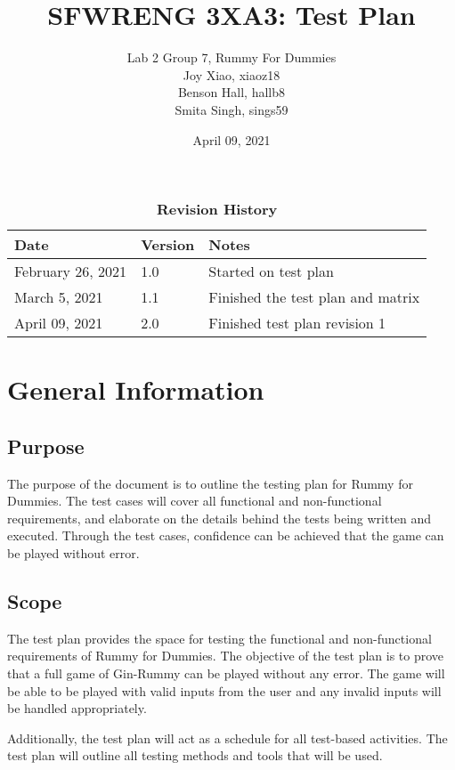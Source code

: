 \documentclass[12pt, titlepage]{article}
\title{SFWRENG 3XA3: Test Plan}
\author{Lab 2 Group 7, Rummy For Dummies
		\\ Joy Xiao, xiaoz18
		\\ Benson Hall, hallb8
		\\ Smita Singh, sings59
}
\date{April 09, 2021}
\begin{document}
\maketitle

\tableofcontents
\listoftables
\listoffigures

\begin{table}[bp]
\caption{\bf Revision History}
\begin{tabularx}{\textwidth}{p{3cm}p{2cm}X}
\toprule {\bf Date} & {\bf Version} & {\bf Notes}\\
\midrule
February 26, 2021 & 1.0 & Started on test plan \\
March 5, 2021 & 1.1 & Finished the test plan and matrix \\
April 09, 2021 & 2.0 & Finished test plan revision 1 \\
\bottomrule
\end{tabularx}
\end{table}

\newpage


\section{General Information}
\subsection{Purpose}
The purpose of the document is to outline the testing plan for Rummy for Dummies. The test cases will cover all functional and non-functional requirements, and elaborate on the details behind the tests being written and executed. Through the test cases, confidence can be achieved that the game can be played without error.

\subsection{Scope}
The test plan provides the space for testing the functional and non-functional requirements of Rummy for Dummies. The objective of the test plan is to prove that a full game of Gin-Rummy can be played without any error. The game will be able to be played with valid inputs from the user and any invalid inputs will be handled appropriately.

Additionally, the test plan will act as a schedule for all test-based activities. The test plan will outline all testing methods and tools that will be used.
\end{document}
